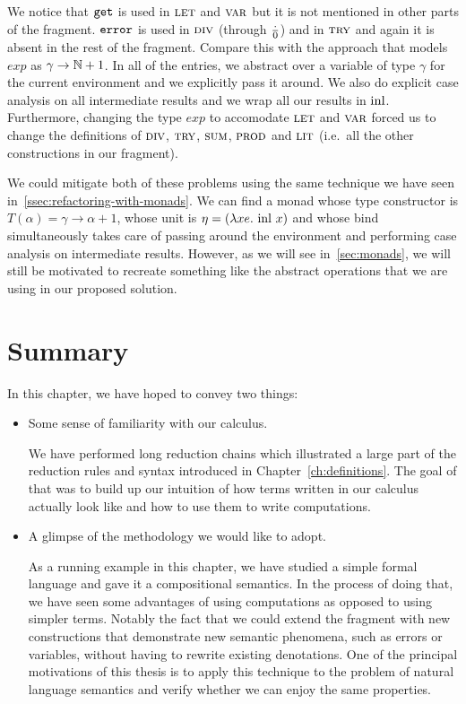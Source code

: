 We notice that $\mathtt{get}$ is used in $\textsc{let}$ and $\textsc{var}$ but it is not
mentioned in other parts of the fragment. $\mathtt{error}$ is used in $\textsc{div}$
(through $\frac{\cdot}{0}$) and in $\textsc{try}$ and again it is absent in the rest of the
fragment. Compare this with the approach that models $exp$ as $\gamma \to
\mathbb{N} + 1$. In all of the entries, we abstract over a variable of type
$\gamma$ for the current environment and we explicitly pass it around. We
also do explicit case analysis on all intermediate results and we wrap all
our results in $\operatorname{inl}$. Furthermore, changing the type $exp$ to accomodate
$\textsc{let}$ and $\textsc{var}$ forced us to change the definitions of $\textsc{div}$,
$\textsc{try}$, $\textsc{sum}$, $\textsc{prod}$ and $\textsc{lit}$ (i.e.\ all the other constructions
in our fragment).

We could mitigate both of these problems using the same technique we have
seen in~\ref{ssec:refactoring-with-monads}. We can find a monad whose type
constructor is $T(\alpha) = \gamma \to \alpha + 1$, whose unit is $\eta =
(\lambda x e.\, \operatorname{inl}\,x)$ and whose bind simultaneously takes care of
passing around the environment and performing case analysis on intermediate
results. However, as we will see in~\ref{sec:monads}, we will still be
motivated to recreate something like the abstract operations that we are
using in our proposed solution.


\section{Summary}

In this chapter, we have hoped to convey two things:

\begin{itemize}
\item Some sense of familiarity with our calculus. 

  We have performed long reduction chains which illustrated a large part of
  the reduction rules and syntax introduced in
  Chapter~\ref{ch:definitions}. The goal of that was to build up our
  intuition of how terms written in our calculus actually look like and how
  to use them to write computations.

\item A glimpse of the methodology we would like to adopt.

  As a running example in this chapter, we have studied a simple formal
  language and gave it a compositional semantics. In the process of doing
  that, we have seen some advantages of using computations as opposed to
  using simpler terms. Notably the fact that we could extend the fragment
  with new constructions that demonstrate new semantic phenomena, such as
  errors or variables, without having to rewrite existing denotations. One
  of the principal motivations of this thesis is to apply this technique to
  the problem of natural language semantics and verify whether we can enjoy
  the same properties.
\end{itemize}
